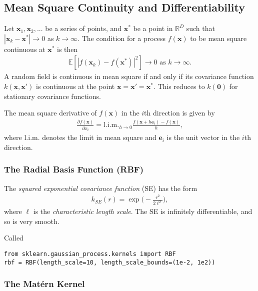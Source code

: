 \documentclass[twoside,english]{uiofysmaster}
\begin{document}
\subsection{Mean Square Continuity and Differentiability}

Let $\textbf{x}_1, \textbf{x}_2,...$ be a series of points, and $\textbf{x}^*$ be a point in $\mathbb{R}^D$ such that $|\textbf{x}_k - \textbf{x}^*| \rightarrow 0$ as $k \rightarrow \infty$. The condition for a process $f(\textbf{x})$ to be mean square continuous at $\textbf{x}^*$ is then
\begin{align}
\mathbb{E}[|f(\textbf{x}_k)-f(\textbf{x}^*)|^2] \rightarrow 0 \text{ as } k \rightarrow \infty.
\end{align} 
A random field is continuous in mean square if and only if its covariance function $k(\textbf{x}, \textbf{x}')$ is continuous at the point $\textbf{x} = \textbf{x}' = \textbf{x}^*$. This reduces to $k(\boldsymbol{0})$ for stationary covariance functions.

The mean square derivative of $f(\textbf{x})$ in the $i$th direction is given by
\begin{align}
\frac{\partial f (\textbf{x})}{\partial x_i} = \text{l.i.m.}_{h \rightarrow 0} \frac{f(\textbf{x} + h \textbf{e}_i) - f(\textbf{x})}{h},
\end{align}
where l.i.m. denotes the limit in mean square and $\textbf{e}_i$ is the unit vector in the $i$th direction.

\subsubsection{The Radial Basis Function (RBF)}

The \textit{squared exponential covariance function} (SE) has the form 
\begin{align}
k_{SE} (r) = \exp \Big( - \frac{r^2}{2 \ell^2} \Big),
\end{align} 
where $\ell$ is the \textit{characteristic length scale}. The SE is infinitely differentiable, and so is very smooth. 

Called 
\begin{lstlisting}
from sklearn.gaussian_process.kernels import RBF
rbf = RBF(length_scale=10, length_scale_bounds=(1e-2, 1e2))
\end{lstlisting}



\subsubsection{The Mat\'{e}rn Kernel}
\end{document}
